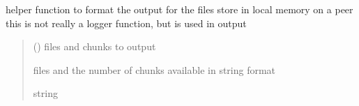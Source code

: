 \documentclass[letterpaper,10pt,english,openany,oneside]{sphinxmanual}
\begin{document}
\begin{fulllineitems}
\label{\detokenize{index:utils.logger.format_file_chunks}}
\pysigstartsignatures
\pysiglinewithargsret
{}
{}
{}
\pysigstopsignatures
\sphinxAtStartPar
helper function to format the output for the files store in local memory on a peer
this is not really a logger function, but is used in output
\begin{quote}\begin{description}
\sphinxAtStartPar
{} (\sphinxstyleliteralemphasis{\sphinxupquote{, }}\sphinxstyleliteralemphasis{\sphinxupquote{, }}) \textendash{} files and chunks to output

\sphinxAtStartPar
files and the number of chunks available in string format

\sphinxAtStartPar
string

\end{description}\end{quote}

\end{fulllineitems}




\renewcommand{\indexname}{Index}
\printindex
\end{document}
